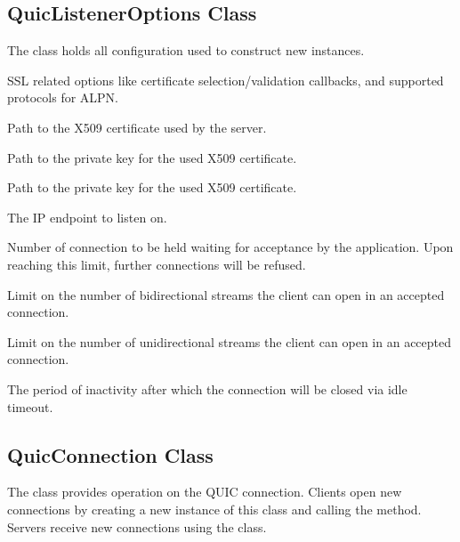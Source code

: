\subsection{QuicListenerOptions Class}

The  class holds all configuration used to construct new  instances.

\begin{description}

        SSL related options like certificate selection/validation callbacks, and supported protocols for ALPN\@.

     Path to the X509 certificate used by the server.

     Path to the private key for the used X509 certificate.

     Path to the private key for the used X509 certificate.

     The IP endpoint to listen on.

     Number of connection to be held waiting for acceptance by the application. Upon reaching this limit, further connections will be refused.

     Limit on the number of bidirectional streams the client can open in an accepted connection.

     Limit on the number of unidirectional streams the client can open in an accepted connection.

     The period of inactivity after which the connection will be closed via idle timeout.

\end{description}

\subsection{QuicConnection Class}

The \QuicConnection{} class provides operation on the QUIC connection. Clients open new
connections by creating a new instance of this class and calling the  method.
Servers receive new connections using the  class.

